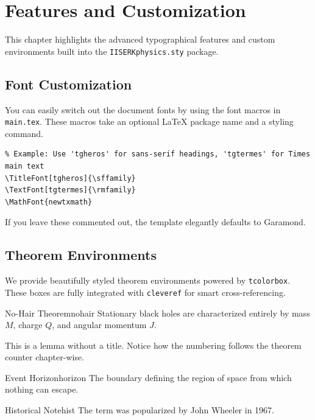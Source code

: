 \chapter{Features and Customization}
\label{ch:features}

This chapter highlights the advanced typographical features and custom environments built into the \texttt{IISERKphysics.sty} package.

\section{Font Customization}
You can easily switch out the document fonts by using the font macros in \texttt{main.tex}. These macros take an optional LaTeX package name and a styling command.
\begin{verbatim}
% Example: Use 'tgheros' for sans-serif headings, 'tgtermes' for Times main text
\TitleFont[tgheros]{\sffamily}
\TextFont[tgtermes]{\rmfamily}
\MathFont{newtxmath}
\end{verbatim}
If you leave these commented out, the template elegantly defaults to Garamond.

\section{Theorem Environments}
We provide beautifully styled theorem environments powered by \texttt{tcolorbox}. These boxes are fully integrated with \texttt{cleveref} for smart cross-referencing.

\begin{theorem}{No-Hair Theorem}{nohair}
    Stationary black holes are characterized entirely by mass $M$, charge $Q$, and angular momentum $J$.
\end{theorem}

\begin{lemma}{}{}
    This is a lemma without a title. Notice how the numbering follows the theorem counter chapter-wise.
\end{lemma}

\begin{definition}{Event Horizon}{horizon}
    The boundary defining the region of space from which nothing can escape.
\end{definition}

\begin{remark}{Historical Note}{hist}
    The term was popularized by John Wheeler in 1967.
\end{remark}

